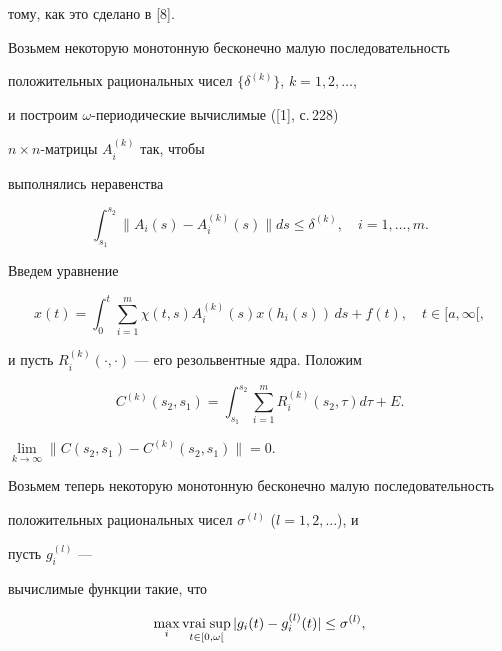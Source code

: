 тому, как это сделано в [8].





Возьмем некоторую  монотонную бесконечно малую последовательность 


положительных рациональных чисел $\{\delta^{(k)}\}$, $k=1,2,\dotsc$,


и построим $\omega$-периодические вычислимые ([1], с.\,228)


$n\times n$-матрицы $A_i^{(k)}$ так, чтобы


выполнялись неравенства


\begin{equation}


\int_{s_1}^{s_2}\|A_i(s)-A_i^{(k)}(s)\|ds\le\delta^{(k)}, \quad i=1,\dotsc,m.


\end{equation}


Введем уравнение


$$


x(t)=\int_0^t\sum_{i=1}^m\chi(t,s)A_i^{(k)}(s)x(h_i(s)) \,ds+f(t),


\quad t\in[a,\infty[,


$$


и пусть $R_i^{(k)}(\cdot,\cdot)$ --- его резольвентные ядра. Положим


\begin{equation}


C^{(k)}(s_2,s_1)=\int_{s_1}^{s_2}\sum_{i=1}^mR_i^{(k)}(s_2,\tau)d\tau+E.


\end{equation}





\begin{lem}


$\lim\limits_{k\to \infty}\|C(s_2,s_1)-C^{(k)}(s_2,s_1)\|=0$.


\end{lem}





Возьмем теперь некоторую монотонную бесконечно малую последовательность 


положительных рациональных чисел $\sigma^{(l)}$ ($l=1,2,\dotsc$), и


пусть $g_i^{(l)}$ ---


вычислимые функции такие, что


\begin{equation}


\max_i\vraisup_{t\in [0,\omega[}|g_i(t)-g_i^{(l)}(t)|\le\sigma^{(l)},


\end{equation}


